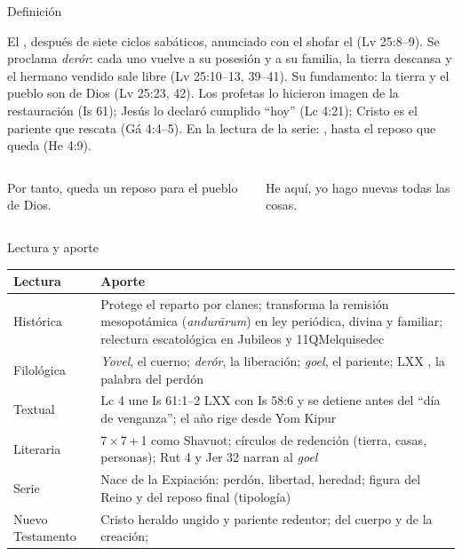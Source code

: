 \begin{frame}{Definición}
\begin{tcolorbox}[colback=papiro,colframe=tierraroja,boxrule=1pt,arc=3pt,left=5pt,right=5pt,title={El Jubileo},fonttitle=\small\bfseries,coltitle=papiro,colbacktitle=tierraroja]
\small\RaggedRight El , después de siete ciclos sabáticos, anunciado con el shofar el  (Lv 25:8--9). Se proclama \emph{derór}: cada uno vuelve a su posesión y a su familia, la tierra descansa y el hermano vendido sale libre (Lv 25:10--13, 39--41). Su fundamento: la tierra y el pueblo son de Dios (Lv 25:23, 42). Los profetas lo hicieron imagen de la restauración (Is 61); Jesús lo declaró cumplido ``hoy'' (Lc 4:21); Cristo es el pariente que rescata (Gá 4:4--5). En la lectura de la serie: , hasta el reposo que queda (He 4:9).
\end{tcolorbox}
\begin{columns}[t,onlytextwidth]
\begin{column}{0.49\textwidth}
\begin{cita}Por tanto, queda un reposo para el pueblo de Dios.\end{cita}
\end{column}
\begin{column}{0.49\textwidth}
\begin{cita}He aquí, yo hago nuevas todas las cosas.\end{cita}
\end{column}
\end{columns}
\end{frame}

\begin{frame}{Lectura y aporte}
\fontsize{6.6}{7.8}\selectfont\renewcommand{\arraystretch}{1.18}
\begin{tabular}{@{}L{2.0cm}L{10.0cm}@{}}
\toprule
\textbf{Lectura} & \textbf{Aporte} \\ \midrule
Histórica & Protege el reparto por clanes; transforma la remisión mesopotámica (\emph{andurārum}) en ley periódica, divina y familiar; relectura escatológica en Jubileos y 11QMelquisedec \\
Filológica & \emph{Yovel}, el cuerno; \emph{derór}, la liberación; \emph{goel}, el pariente; LXX , la palabra del perdón \\
Textual & Lc 4 une Is 61:1--2 LXX con Is 58:6 y se detiene antes del ``día de venganza''; el año rige desde Yom Kipur \\
Literaria & 7\,×\,7\,+\,1 como Shavuot; círculos de redención (tierra, casas, personas); Rut 4 y Jer 32 narran al \emph{goel} \\
Serie & Nace de la Expiación: perdón, libertad, heredad; figura del Reino y del reposo final (tipología) \\
Nuevo Testamento & Cristo heraldo ungido y pariente redentor;  del cuerpo y de la creación;  \\
\bottomrule
\end{tabular}
\end{frame}


